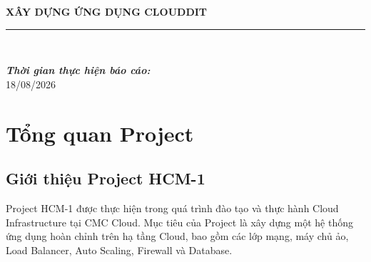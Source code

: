 \documentclass[12pt, a4paper]{article}
\begin{document}
\begin{titlepage}
{{\begin{minipage}{0.82\textwidth}
            {\huge \bfseries
            XÂY DỰNG ỨNG DỤNG CLOUDDIT
            }\\[0.5cm]

            \rule{0.85\linewidth}{0.6mm}\\[0.8cm]

            {\large
            \emph{\textbf{Thời gian thực hiện báo cáo:}}\\[0.2cm]
            18/08/2026
            \par}

            \vspace{0.4cm}

        \end{minipage}
    }%
}

\end{titlepage}


\tableofcontents
\clearpage


\listoffigures
\clearpage


\listoftables
\clearpage


\section{Tổng quan Project}

\subsection{Giới thiệu Project HCM-1}

Project HCM-1 được thực hiện trong quá trình đào tạo và thực hành
Cloud Infrastructure tại CMC Cloud. Mục tiêu của Project là xây dựng
một hệ thống ứng dụng hoàn chỉnh trên hạ tầng Cloud, bao gồm các lớp
mạng, máy chủ ảo, Load Balancer, Auto Scaling, Firewall và Database. \\
\end{document}
